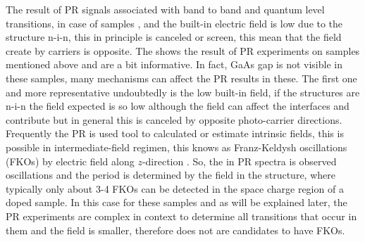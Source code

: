 The result of PR signals associated with band to band and quantum level transitions, in case of samples ,  and  the built-in electric field is low due to the structure n-i-n, this in principle is canceled or screen, this mean that  the field create by carriers is opposite. The  shows the result of PR experiments on samples mentioned above and are a bit informative. In fact, GaAs gap is not visible in these samples, many mechanisms can affect the PR results in these. The first one and more representative  undoubtedly is the low built-in field, if the structures are n-i-n the field expected is so low although the field can affect the interfaces and contribute but in general this is canceled by opposite photo-carrier directions. Frequently the PR is used tool to calculated or estimate intrinsic fields, this is possible in intermediate-field regimen, this knows as Franz-Keldysh oscillations  (FKOs) by electric field along $z$-direction \cite{shen1995franz}. So, the in PR spectra is observed oscillations and the period is determined by the field in the structure, where typically only about 3-4 FKOs can be detected in the space charge region of a doped sample. In this case for these samples and as will be explained later, the PR experiments are complex in context to determine all transitions  that occur in them and the field is smaller, therefore does not are candidates to have FKOs.

